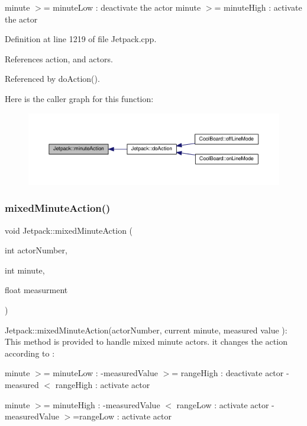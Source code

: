 minute $>$= minute\+Low \+: deactivate the actor minute $>$= minute\+High \+: activate the actor 

Definition at line 1219 of file Jetpack.\+cpp.



References action, and actors.



Referenced by do\+Action().

Here is the caller graph for this function\+:
\nopagebreak
\begin{figure}[H]
\begin{center}
\leavevmode
\includegraphics[width=350pt]{df/d1d/class_jetpack_a97da41141c7b53ddee61143519c8d17d_icgraph}
\end{center}
\end{figure}
\mbox{\label{class_jetpack_acf8ed1fb594b9e8e224f4ed872a8e093}} 
\subsubsection{\texorpdfstring{mixed\+Minute\+Action()}{mixedMinuteAction()}}
{\footnotesize\ttfamily void Jetpack\+::mixed\+Minute\+Action (\begin{DoxyParamCaption}\item[{int}]{actor\+Number,  }\item[{int}]{minute,  }\item[{float}]{measurment }\end{DoxyParamCaption})}

Jetpack\+::mixed\+Minute\+Action(actor\+Number, current minute, measured value )\+: This method is provided to handle mixed minute actors. it changes the action according to \+:

minute $>$= minute\+Low \+: -\/measured\+Value $>$= range\+High \+: deactivate actor -\/measured $<$ range\+High \+: activate actor

minute $>$= minute\+High \+: -\/measured\+Value $<$ range\+Low \+: activate actor -\/measured\+Value $>$=range\+Low \+: activate actor 


